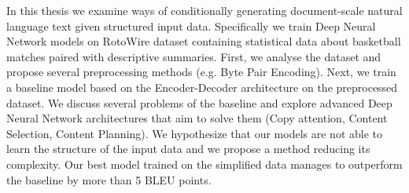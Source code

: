 \documentclass[12pt]{report}
\begin{document}

In this thesis we examine ways of conditionally generating document-scale natural language text given structured input data. Specifically we train Deep Neural Network models on  RotoWire dataset containing statistical data about basketball matches paired with descriptive summaries. First, we analyse the dataset and propose several preprocessing methods (e.g. Byte Pair Encoding). Next, we train a baseline model based on the Encoder-Decoder architecture on the preprocessed dataset. We discuss several problems of the baseline and explore advanced Deep Neural Network architectures that aim to solve them (Copy attention, Content Selection, Content Planning). We hypothesize that our models are not able to learn the structure of the input data and we propose a method reducing its complexity. Our best model trained on the simplified data manages to outperform the baseline by more than 5 BLEU points.
\end{document}
